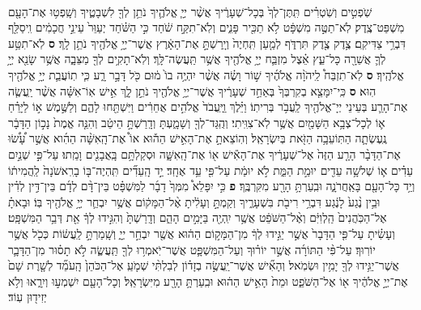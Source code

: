 \documentclass[twoside, openany, parskip=half, 11pt]{book}
\begin{document}
\begin{footnotesize}
\begin{multicols}{2}
\\
 שֹֽׁפְטִ֣ים וְשֹֽׁטְרִ֗ים תִּֽתֶּן־לְךָ֙ בְּכָל־שְׁעָרֶ֔יךָ אֲשֶׁ֨ר יְיָ֧ אֱלֹהֶ֛יךָ נֹתֵ֥ן לְךָ֖ לִשְׁבָטֶ֑יךָ וְשָֽׁפְט֥וּ אֶת־הָעָ֖ם מִשְׁפַּט־צֶֽדֶק׃ לֹֽא־תַטֶּ֣ה מִשְׁפָּ֔ט לֹ֥א תַכִּ֖יר פָּנִ֑ים וְלֹֽא־תִקַּ֣ח שֹׁ֔חַד כִּ֣י הַשֹּׁ֗חַד יְעַוֵּר֙ עֵינֵ֣י חֲכָמִ֔ים וִֽיסַלֵּ֖ף דִּבְרֵ֥י צַדִּיקִֽם׃ צֶ֥דֶק צֶ֖דֶק תִּרְדֹּ֑ף לְמַ֤עַן תִּֽחְיֶה֙ וְיָֽרַשְׁתָּ֣ אֶת־הָאָ֔רֶץ אֲשֶׁר־יְיָ֥ אֱלֹהֶ֖יךָ נֹתֵ֥ן לָֽךְ׃ \textbf{ס} 
 לֹֽא־תִטַּ֥ע לְךָ֛ אֲשֵׁרָ֖ה כָּל־עֵ֑ץ אֵ֗צֶל מִזְבַּ֛ח יְיָ֥ אֱלֹהֶ֖יךָ אֲשֶׁ֥ר תַּֽעֲשֶׂה־לָּֽךְ׃ וְלֹֽא־תָקִ֥ים לְךָ֖ מַצֵּבָ֑ה אֲשֶׁ֥ר שָׂנֵ֖א יְיָ֥ אֱלֹהֶֽיךָ׃ \textbf{ס} לֹֽא־תִזְבַּח֩ לַֽיהֹוָ֨ה אֱלֹהֶ֜יךָ שׁ֣וֹר וָשֶׂ֗ה אֲשֶׁ֨ר יִהְיֶ֥ה בוֹ֙ מ֔וּם כֹּ֖ל דָּבָ֣ר רָ֑ע כִּ֧י תֽוֹעֲבַ֛ת יְיָ֥ אֱלֹהֶ֖יךָ הֽוּא׃ \textbf{ס} כִּֽי־יִמָּצֵ֤א בְקִרְבְּךָ֙ בְּאַחַ֣ד שְׁעָרֶ֔יךָ אֲשֶׁר־יְיָ֥ אֱלֹהֶ֖יךָ נֹתֵ֣ן לָ֑ךְ אִ֣ישׁ אֽוֹ־אִשָּׁ֗ה אֲשֶׁ֨ר יַֽעֲשֶׂ֧ה אֶת־הָרַ֛ע בְּעֵינֵי יְיָ־אֱלֹהֶ֖יךָ לַֽעֲבֹ֥ר בְּרִיתֽוֹ׃ וַיֵּ֗לֶךְ וַֽיַּֽעֲבֹד֙ אֱלֹהִ֣ים אֲחֵרִ֔ים וַיִּשְׁתַּ֖חוּ לָהֶ֑ם וְלַשֶּׁ֣מֶשׁ א֣וֹ לַיָּרֵ֗חַ א֛וֹ לְכָל־צְבָ֥א הַשָּׁמַ֖יִם אֲשֶׁ֥ר לֹֽא־צִוִּֽיתִי׃ וְהֻֽגַּד־לְךָ֖ וְשָׁמָ֑עְתָּ וְדָֽרַשְׁתָּ֣ הֵיטֵ֔ב וְהִנֵּ֤ה אֱמֶת֙ נָכ֣וֹן הַדָּבָ֔ר נֶֽעֶשְׂתָ֛ה הַתּֽוֹעֵבָ֥ה הַזֹּ֖את בְּיִשְׂרָאֵֽל׃ וְהֽוֹצֵאתָ֣ אֶת־הָאִ֣ישׁ הַה֡וּא אוֹ֩ אֶת־הָֽאִשָּׁ֨ה הַהִ֜וא אֲשֶׁ֣ר עָ֠שׂ֠וּ אֶת־הַדָּבָ֨ר הָרָ֤ע הַזֶּה֙ אֶל־שְׁעָרֶ֔יךָ אֶת־הָאִ֕ישׁ א֖וֹ אֶת־הָֽאִשָּׁ֑ה וּסְקַלְתָּ֥ם בָּֽאֲבָנִ֖ים וָמֵֽתוּ׃ עַל־פִּ֣י שְׁנַ֣יִם עֵדִ֗ים א֛וֹ שְׁלשָׁ֥ה עֵדִ֖ים יוּמַ֣ת הַמֵּ֑ת לֹ֣א יוּמַ֔ת עַל־פִּ֖י עֵ֥ד אֶחָֽד׃ יַ֣ד הָֽעֵדִ֞ים תִּֽהְיֶה־בּ֤וֹ בָרִֽאשֹׁנָה֙ לַֽהֲמִית֔וֹ וְיַ֥ד כָּל־הָעָ֖ם בָּאַֽחֲרֹנָ֑ה וּבִֽעַרְתָּ֥ הָרָ֖ע מִקִּרְבֶּֽךָ׃ \textbf{פ} 
כִּ֣י יִפָּלֵא֩ מִמְּךָ֙ דָבָ֜ר לַמִּשְׁפָּ֗ט בֵּין־דָּ֨ם לְדָ֜ם בֵּין־דִּ֣ין לְדִ֗ין וּבֵ֥ין נֶ֨גַע֙ לָנֶ֔גַע דִּבְרֵ֥י רִיבֹ֖ת בִּשְׁעָרֶ֑יךָ וְקַמְתָּ֣ וְעָלִ֔יתָ אֶ֨ל־הַמָּק֔וֹם אֲשֶׁ֥ר יִבְחַ֛ר יְיָ֥ אֱלֹהֶ֖יךָ בּֽוֹ׃ וּבָאתָ֗ אֶל־הַכֹּֽהֲנִים֙ הַֽלְוִיִּ֔ם וְאֶ֨ל־הַשֹּׁפֵ֔ט אֲשֶׁ֥ר יִֽהְיֶ֖ה בַּיָּמִ֣ים הָהֵ֑ם וְדָֽרַשְׁתָּ֙ וְהִגִּ֣ידוּ לְךָ֔ אֵ֖ת דְּבַ֥ר הַמִּשְׁפָּֽט׃ וְעָשִׂ֗יתָ עַל־פִּ֤י הַדָּבָר֙ אֲשֶׁ֣ר יַגִּ֣ידוּ לְךָ֔ מִן־הַמָּק֣וֹם הַה֔וּא אֲשֶׁ֖ר יִבְחַ֣ר יְיָ֑ וְשָֽׁמַרְתָּ֣ לַֽעֲשׂ֔וֹת כְּכֹ֖ל אֲשֶׁ֥ר יוֹרֽוּךָ׃ 
עַל־פִּ֨י הַתּוֹרָ֜ה אֲשֶׁ֣ר יוֹר֗וּךָ וְעַל־הַמִּשְׁפָּ֛ט אֲשֶׁר־יֹֽאמְר֥וּ לְךָ֖ תַּֽעֲשֶׂ֑ה לֹ֣א תָס֗וּר מִן־הַדָּבָ֛ר אֲשֶׁר־יַגִּ֥ידוּ לְךָ֖ יָמִ֥ין וּשְׂמֹֽאל׃ וְהָאִ֞ישׁ אֲשֶׁר־יַֽעֲשֶׂ֣ה בְזָד֗וֹן לְבִלְתִּ֨י שְׁמֹ֤עַֽ אֶל־הַכֹּהֵן֙ הָֽעֹמֵ֞ד לְשָׁ֤רֶת שָׁם֙ אֶת־יְיָ֣ אֱלֹהֶ֔יךָ א֖וֹ אֶל־הַשֹּׁפֵ֑ט וּמֵת֙ הָאִ֣ישׁ הַה֔וּא וּבִֽעַרְתָּ֥ הָרָ֖ע מִיִּשְׂרָאֵֽל׃ וְכָל־הָעָ֖ם יִשְׁמְע֣וּ וְיִרָ֑אוּ וְלֹ֥א יְזִיד֖וּן עֽוֹד׃


\end{multicols}
\end{footnotesize}
\end{document}
